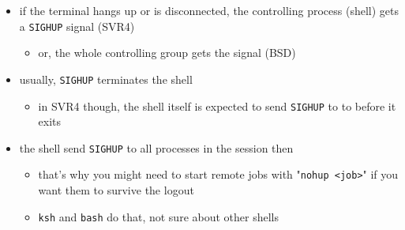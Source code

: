 \begin{itemize}
\item if the terminal hangs up or is disconnected, the controlling process
(shell) gets a \texttt{SIGHUP} signal (SVR4)
\begin{itemize}
  	\item or, the whole controlling group gets the signal (BSD)
\end{itemize}
\item usually, \texttt{SIGHUP} terminates the shell
\begin{itemize}
	\item in SVR4 though, the shell itself is expected to send
	\texttt{SIGHUP} to to  before it exits
\end{itemize}
\item the shell  send \texttt{SIGHUP} to all processes in the session then
\begin{itemize}
	\item that's why you might need to start remote jobs with "\texttt{nohup
	<job>}" if you want them to survive the logout
	\item \texttt{ksh} and \texttt{bash} do that, not sure about other
	shells
\end{itemize}
\end{itemize}

\label{SIGHUP_SIGNAL}

